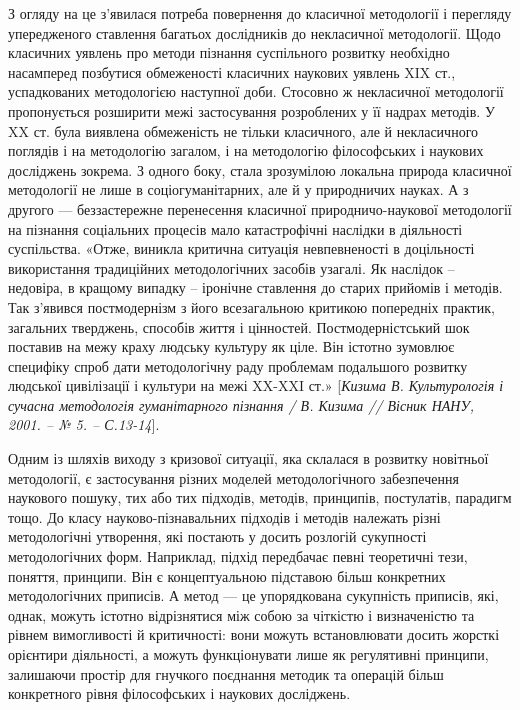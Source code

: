 З огляду на це з’явилася потреба повернення до класичної методології і
перегляду упередженого ставлення багатьох дослідників до некласичної
методології. Щодо класичних уявлень про методи пізнання суспільного
розвитку необхідно насамперед позбутися обмеженості класичних наукових
уявлень XIX ст., успадкованих методологією наступної доби. Стосовно ж
некласичної методології пропонується розширити межі застосування
розроблених у її надрах методів. У XX ст. була виявлена обмеженість не тільки
класичного, але й некласичного поглядів і на методологію загалом, і на
методологію філософських і наукових досліджень зокрема. З одного боку, стала
зрозумілою локальна природа класичної методології не лише в соціогуманітарних, але й у природничих науках. А з другого --- беззастережне
перенесення класичної природничо-наукової методології на пізнання
соціальних процесів мало катастрофічні наслідки в діяльності суспільства.
«Отже, виникла критична ситуація невпевненості в доцільності використання
традиційних методологічних засобів узагалі. Як наслідок – недовіра, в кращому
випадку – іронічне ставлення до старих прийомів і методів. Так з’явився
постмодернізм з його всезагальною критикою попередніх практик, загальних
тверджень, способів життя і цінностей. Постмодерністський шок поставив на
межу краху людську культуру як ціле. Він істотно зумовлює специфіку спроб
дати методологічну раду проблемам подальшого розвитку людської цивілізації
і культури на межі XX-XXI ст.» [\textit{Кизима В. Культурологія і сучасна
методологія гуманітарного пізнання / В. Кизима // Вісник НАНУ, 2001. – № 5. –
С.13-14}].

Одним із шляхів виходу з кризової ситуації, яка склалася в розвитку
новітньої методології, є застосування різних моделей методологічного
забезпечення наукового пошуку, тих або тих підходів, методів, принципів,
постулатів, парадигм тощо. До класу науково-пізнавальних підходів і методів
належать різні методологічні утворення, які постають у досить розлогій
сукупності методологічних форм. Наприклад, підхід передбачає певні
теоретичні тези, поняття, принципи. Він є концептуальною підставою більш
конкретних методологічних приписів. А метод --- це упорядкована сукупність
приписів, які, однак, можуть істотно відрізнятися між собою за чіткістю і
визначеністю та рівнем вимогливості й критичності: вони можуть
встановлювати досить жорсткі орієнтири діяльності, а можуть функціонувати
лише як регулятивні принципи, залишаючи простір для гнучкого поєднання
методик та операцій більш конкретного рівня філософських і наукових
досліджень.

